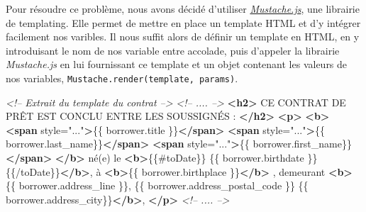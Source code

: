 \documentclass[12pt,a4paper]{article}
\newenvironment{Shaded}{}{}
\newcommand{\KeywordTok}[1]{\textcolor[rgb]{0.00,0.44,0.13}{\textbf{{#1}}}}
\newcommand{\StringTok}[1]{\textcolor[rgb]{0.25,0.44,0.63}{{#1}}}
\newcommand{\CommentTok}[1]{\textcolor[rgb]{0.38,0.63,0.69}{\textit{{#1}}}}
\newcommand{\OtherTok}[1]{\textcolor[rgb]{0.00,0.44,0.13}{{#1}}}
\newcommand{\NormalTok}[1]{{#1}}
\begin{document}
  \bigskip

  Pour résoudre ce problème, nous avons décidé d'utiliser
  \href{https://github.com/janl/mustache.js}{\emph{Mustache.js}}, une
  librairie de templating. Elle permet de mettre en place un template HTML
  et d'y intégrer facilement nos varibles. Il nous suffit alors de définir
  un template en HTML, en y introduisant le nom de nos variable entre
  accolade, puis d'appeler la librairie \emph{Mustache.js} en lui
  fournissant ce template et un objet contenant les valeurs de nos
  variables, \texttt{Mustache.render(template,\ params)}.

  \begin{Shaded}
  \begin{Highlighting}[]
  \CommentTok{<!-- Extrait du template du contrat -->}
  \CommentTok{<!-- .... -->}
  \KeywordTok{<h2>}
    \NormalTok{CE CONTRAT DE PRÊT EST CONCLU ENTRE LES SOUSSIGNÉS :}
  \KeywordTok{</h2>}
  \KeywordTok{<p>}
    \KeywordTok{<b>}
      \KeywordTok{<span}\OtherTok{ style=}\StringTok{"..."}\KeywordTok{>}\NormalTok{\{\{ borrower.title \}\}}\KeywordTok{</span>}
      \KeywordTok{<span}\OtherTok{ style=}\StringTok{"..."}\KeywordTok{>}\NormalTok{\{\{ borrower.last_name\}\}}\KeywordTok{</span>}
      \KeywordTok{<span}\OtherTok{ style=}\StringTok{"..."}\KeywordTok{>}\NormalTok{\{\{ borrower.first_name\}\}}\KeywordTok{</span>}
    \KeywordTok{</b>}
    \NormalTok{né(e) le}
    \KeywordTok{<b>}\NormalTok{\{\{#toDate\}\} \{\{ borrower.birthdate \}\} \{\{/toDate\}\}}\KeywordTok{</b>}\NormalTok{,}
    \NormalTok{à}
    \KeywordTok{<b>}\NormalTok{\{\{ borrower.birthplace \}\}}\KeywordTok{</b>}
    \NormalTok{, demeurant}
    \KeywordTok{<b>}
      \NormalTok{\{\{ borrower.address_line \}\},}
      \NormalTok{\{\{ borrower.address_postal_code \}\}}
      \NormalTok{\{\{ borrower.address_city\}\}}\KeywordTok{</b>}\NormalTok{,}
  \KeywordTok{</p>}
  \CommentTok{<!-- .... -->}
  \end{Highlighting}
  \end{Shaded}
\end{document}
